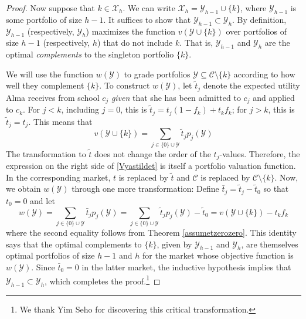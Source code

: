 \documentclass[12pt]{article} %
\theoremstyle{definition}
\theoremstyle{definition}
\begin{document}
\begin{proof}
Now suppose that $k \in \mathcal{X}_h$. We can write $\mathcal{X}_h = \mathcal{Y}_{h-1} \cup \{k\}$, where $ \mathcal{Y}_{h-1}$ is some portfolio of size $h-1$. It suffices to show that $ \mathcal{Y}_{h-1} \subset \mathcal{Y}_h$. By definition, $\mathcal{Y}_{h-1}$ (respectively, $\mathcal{Y}_{h}$) maximizes the function $v(\mathcal{Y}\cup\{k\})$ over portfolios of size $h-1$ (respectively, $h$) that do not include $k$. That is, $\mathcal{Y}_{h-1}$ and $\mathcal{Y}_h$ are the optimal \emph{complements} to the singleton portfolio $\{k\}$.

We will use the function $w(\mathcal{Y})$ to grade portfolios $\mathcal{Y} \subseteq \mathcal{C} \setminus \{k\}$ according to how well they complement $\{k\}$. To construct $w(\mathcal{Y})$, let $\tilde t_j$ denote the expected utility Alma receives from school $c_j$ \emph{given} that she has been admitted to $c_j$ and applied to $c_k$. For $j < k$, including $j = 0$, this is $\tilde t_j = t_j (1- f_k) + t_k f_k$; for $j > k $, this is $\tilde t_j = t_j$. This means that 
\begin{equation}\label{Vyastildet}
v(\mathcal{Y}\cup\{k\}) = \sum_{j \in \{0\} \cup \mathcal{Y}} \tilde t_j p_j(\mathcal{Y})\end{equation}
The transformation to $\tilde t$ does not change the order of the $t_j$-values. Therefore, the expression on the right side of \eqref{Vyastildet} is itself a portfolio valuation function. In the corresponding market, $t$ is replaced by $\tilde t$ and $\mathcal{C}$ is replaced by $\mathcal{C}\setminus\{k\}$. Now, we obtain $w(\mathcal{Y})$ through one more transformation: Define $\bar t_j = \tilde t_j - \tilde t_0$ so that $t_0 = 0$ and let
\begin{equation}  \label{wYvXminusconst}
w(\mathcal{Y})
= \sum_{j \in \{0\} \cup \mathcal{Y}} \bar t_j p_j(\mathcal{Y})
= \sum_{j \in \{0\} \cup \mathcal{Y}} \tilde t_j p_j(\mathcal{Y})- \tilde t_0
= v(\mathcal{Y}\cup\{k\}) -  t_k f_k \end{equation}
where the second equality follows from Theorem \ref{assumetzerozero}. This identity says that the optimal complements to $\{k\}$, given by $\mathcal{Y}_{h-1}$ and $\mathcal{Y}_h$, are themselves optimal portfolios of size $h-1$ and $h$ for the market whose objective function is $w(\mathcal{Y})$. Since $\bar t_0 = 0$ in the latter market, the inductive hypothesis implies that $\mathcal{Y}_{h-1} \subset \mathcal{Y}_h$, which completes the proof.\footnote{We thank Yim Seho for discovering this critical transformation.}
\end{proof}
\end{document}

